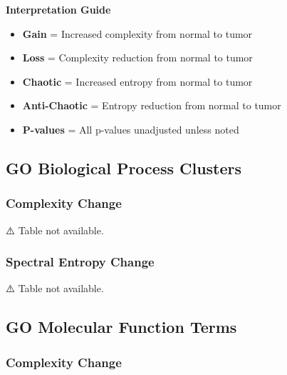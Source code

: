 \documentclass[
  letterpaper,
  DIV=11,
  numbers=noendperiod,
  openany,
  oneside]{scrreprt}
\providecommand{\tightlist}{%
  \setlength{\itemsep}{0pt}\setlength{\parskip}{0pt}}
\begin{document}
\begin{tcolorbox}[enhanced jigsaw, opacityback=0, colframe=quarto-callout-note-color-frame, toptitle=1mm, colback=white, breakable, toprule=.15mm, bottomrule=.15mm, opacitybacktitle=0.6, title=\textcolor{quarto-callout-note-color}{\faInfo}\hspace{0.5em}{Note}, coltitle=black, rightrule=.15mm, leftrule=.75mm, left=2mm, bottomtitle=1mm, titlerule=0mm, colbacktitle=quarto-callout-note-color!10!white, arc=.35mm]

\textbf{Interpretation Guide}

\begin{itemize}
\tightlist
\item
  \textbf{Gain} = Increased complexity from normal to tumor
\item
  \textbf{Loss} = Complexity reduction from normal to tumor
\item
  \textbf{Chaotic} = Increased entropy from normal to tumor
\item
  \textbf{Anti-Chaotic} = Entropy reduction from normal to tumor
\item
  \textbf{P-values} = All p-values unadjusted unless noted
\end{itemize}

\end{tcolorbox}

\subsection{GO Biological Process Clusters}

\subsubsection{Complexity Change}

⚠️ Table not available.

\subsubsection{Spectral Entropy Change}

⚠️ Table not available.

\subsection{GO Molecular Function Terms}

\subsubsection{Complexity Change}
\end{document}
